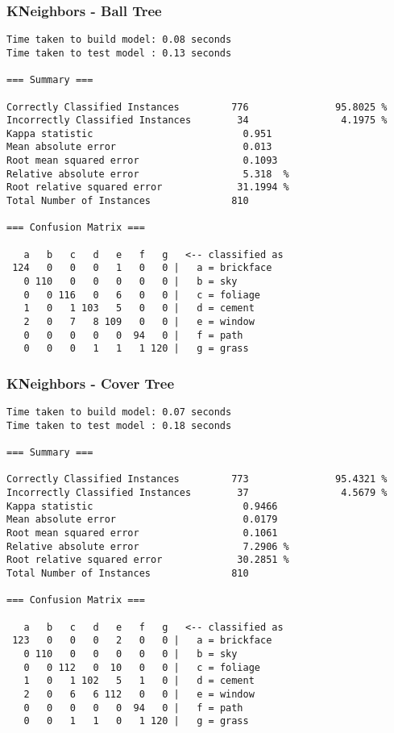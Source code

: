\documentclass[a4paper]{article}
\begin{document}
\subsubsection{KNeighbors - Ball Tree}
\begin{verbatim}
Time taken to build model: 0.08 seconds
Time taken to test model : 0.13 seconds

=== Summary ===

Correctly Classified Instances         776               95.8025 %
Incorrectly Classified Instances        34                4.1975 %
Kappa statistic                          0.951
Mean absolute error                      0.013
Root mean squared error                  0.1093
Relative absolute error                  5.318  %
Root relative squared error             31.1994 %
Total Number of Instances              810

=== Confusion Matrix ===

   a   b   c   d   e   f   g   <-- classified as
 124   0   0   0   1   0   0 |   a = brickface
   0 110   0   0   0   0   0 |   b = sky
   0   0 116   0   6   0   0 |   c = foliage
   1   0   1 103   5   0   0 |   d = cement
   2   0   7   8 109   0   0 |   e = window
   0   0   0   0   0  94   0 |   f = path
   0   0   0   1   1   1 120 |   g = grass

\end{verbatim}
\subsubsection{KNeighbors - Cover Tree}
\begin{verbatim}
Time taken to build model: 0.07 seconds
Time taken to test model : 0.18 seconds

=== Summary ===

Correctly Classified Instances         773               95.4321 %
Incorrectly Classified Instances        37                4.5679 %
Kappa statistic                          0.9466
Mean absolute error                      0.0179
Root mean squared error                  0.1061
Relative absolute error                  7.2906 %
Root relative squared error             30.2851 %
Total Number of Instances              810

=== Confusion Matrix ===

   a   b   c   d   e   f   g   <-- classified as
 123   0   0   0   2   0   0 |   a = brickface
   0 110   0   0   0   0   0 |   b = sky
   0   0 112   0  10   0   0 |   c = foliage
   1   0   1 102   5   1   0 |   d = cement
   2   0   6   6 112   0   0 |   e = window
   0   0   0   0   0  94   0 |   f = path
   0   0   1   1   0   1 120 |   g = grass

\end{verbatim}
\end{document}
